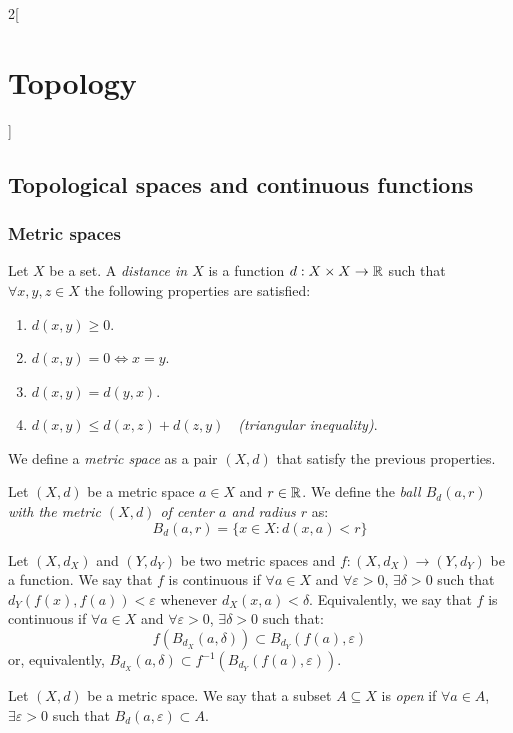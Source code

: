 \documentclass[../../../main.tex]{subfiles}
\begin{document}
\begin{multicols}{2}[\section{Topology}]
  \subsection{Topological spaces and continuous functions}
  \subsubsection*{Metric spaces}
  \begin{definition}
    Let $X$ be a set. A \textit{distance in $X$} is a function $d:X\times X\rightarrow\mathbb{R} $ such that $\forall x,y,z\in X$ the following properties are satisfied:
    \begin{enumerate}
      \item $d(x,y)\geq 0$.
      \item $d(x,y)=0\iff x=y$.
      \item $d(x,y)=d(y,x)$.
      \item $d(x,y)\leq d(x,z)+d(z,y)\quad$\textit{(triangular inequality)}.
    \end{enumerate}
    We define a \textit{metric space} as a pair $(X,d)$ that satisfy the previous properties.
  \end{definition}
  \begin{definition}
    Let $(X,d)$ be a metric space $a\in X$ and $r\in\mathbb{R}$. We define the \textit{ball $B_d(a,r)$ with the metric $(X,d)$ of center $a$ and radius $r$} as: $$B_d(a,r)=\{x\in X:d(x,a)<r\}$$
  \end{definition}
  \begin{definition}
    Let $(X,d_X)$ and $(Y,d_Y)$ be two metric spaces and $f:(X,d_X)\rightarrow(Y,d_Y)$ be a function. We say that $f$ is continuous if $\forall a\in X$ and $\forall\varepsilon>0$, $\exists\delta>0$ such that $d_Y(f(x),f(a))<\varepsilon$ whenever $d_X(x,a)<\delta$. Equivalently, we say that $f$ is continuous if $\forall a\in X$ and $\forall\varepsilon>0$, $\exists\delta>0$ such that: $$f(B_{d_X}(a,\delta))\subset B_{d_Y}(f(a),\varepsilon)$$ or, equivalently, $B_{d_X}(a,\delta)\subset f^{-1}\left(B_{d_Y}(f(a),\varepsilon)\right)$.
  \end{definition}
  \begin{definition}
    Let $(X,d)$ be a metric space. We say that a subset $A\subseteq X$ is \textit{open} if $\forall a\in A$, $\exists\varepsilon>0$ such that $B_d(a,\varepsilon)\subset A$.

\end{definition}
\end{multicols}
\end{document}
